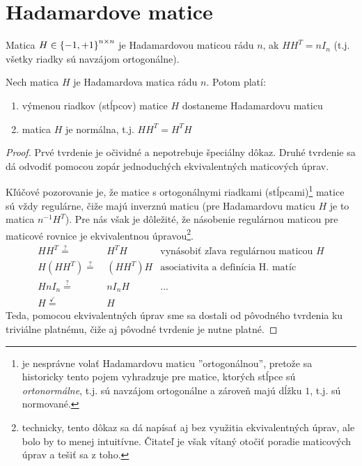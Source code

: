 \section{Hadamardove matice}

\begin{definition}
Matica $H \in \left\{-1, +1\right\}^{n \times n}$ je Hadamardovou maticou rádu $n$, ak $HH^T = nI_n$ (t.j. všetky riadky sú navzájom ortogonálne).
\end{definition}

\begin{theorem}
Nech matica $H$ je Hadamardova matica rádu $n$. Potom platí:
\begin{enumerate}
    \item výmenou riadkov (stĺpcov) matice $H$ dostaneme Hadamardovu maticu
    \item matica $H$ je normálna, t.j. $HH^T = H^T H$
\end{enumerate}
\end{theorem}


\begin{proof}
Prvé tvrdenie je očividné a nepotrebuje špeciálny dôkaz.
Druhé tvrdenie sa dá odvodiť pomocou zopár jednoduchých ekvivalentných maticových úprav.

Kľúčové pozorovanie je, že matice s ortogonálnymi riadkami (stĺpcami)\footnote{je nesprávne volať Hadamardovu maticu ''ortogonálnou'', pretože sa historicky tento pojem vyhradzuje pre matice, ktorých stĺpce sú \emph{ortonormálne}, t.j. sú navzájom ortogonálne a zároveň majú dĺžku $1$, t.j. sú normované.} matice sú vždy regulárne, čiže majú inverznú maticu (pre Hadamardovu maticu $H$ je to matica $n^{-1} H^T$).
Pre nás však je dôležité, že násobenie regulárnou maticou pre maticové rovnice je ekvivalentnou úpravou\footnote{technicky, tento dôkaz sa dá napísať aj bez využitia ekvivalentných úprav, ale bolo by to menej intuitívne. Čitateľ je však vítaný otočiť poradie maticových úprav a tešiť sa z toho.}.
\begin{align*}
    HH^T \overset{?}{=}&~ H^TH&\text{vynásobiť zľava regulárnou maticou $H$}\\
    H(HH^T) \overset{?}{=}&~ (HH^T)H&\text{asociativita a definícia H. matíc}\\
    HnI_n \overset{?}{=}&~ nI_nH&\text{...}\\
    H \overset{\checkmark}{=}&~ H&\text{}
\end{align*}
Teda, pomocou ekvivalentných úprav sme sa dostali od pôvodného tvrdenia ku triviálne platnému, čiže aj pôvodné tvrdenie je nutne platné.
\end{proof}

